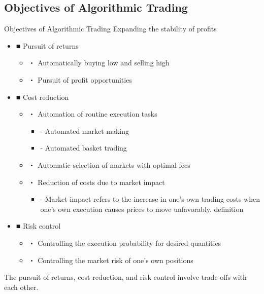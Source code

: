 \documentclass[dvipdfmx, autodetect-engine, aspectratio=169, 10.5pt]{beamer}
\begin{document}
\subsection{Objectives of Algorithmic Trading}
\begin{frame}{Objectives of Algorithmic Trading}
	\scriptsize
	Expanding the stability of profits
	\begin{itemize}
		\item ■ Pursuit of returns
		      \begin{itemize}
			      \item ・ Automatically buying low and selling high
			      \item ・ Pursuit of profit opportunities
		      \end{itemize}
		\item ■ Cost reduction
		      \begin{itemize}
			      \item ・ Automation of routine execution tasks
			            \begin{itemize}
				            \item - Automated market making
				            \item - Automated basket trading
			            \end{itemize}
			      \item ・ Automatic selection of markets with optimal fees
			      \item ・ Reduction of costs due to market impact
			            \begin{itemize}
				            \item - Market impact refers to the increase in one's own trading costs when one's own execution causes prices to move unfavorably. definition
			            \end{itemize}
		      \end{itemize}
		\item ■ Risk control
		      \begin{itemize}
			      \item ・ Controlling the execution probability for desired quantities
			      \item ・ Controlling the market risk of one's own positions
		      \end{itemize}
	\end{itemize}
	\vspace{5ex}
	The pursuit of returns, cost reduction, and risk control involve trade-offs with each other.
\end{frame}
\end{document}
